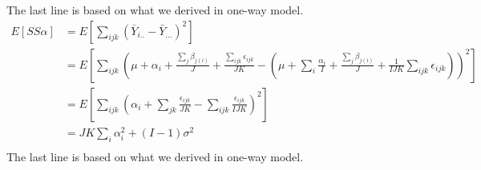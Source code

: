 \documentclass[a4paper]{article}
\begin{document}
The last line is based on what we derived in one-way model.
\begin{align*}
	E[SS\alpha] & = E[\sum_{ijk}(\bar Y_{i..} - \bar Y_{...})^2]\\
				& = E[\sum_{ijk}(\mu + \alpha_i + \frac{\sum_j \beta_{j(i)}}{J} + \frac{\sum_{ijk} \epsilon_{ijk}}{JK}
				-(\mu + \sum_{i} \frac{\alpha_i}{I} + \frac{\sum_j \beta_{j(i)}}{J}  + \frac{1}{IJK} \sum_{ijk} \epsilon_{ijk}))^2]\\
				& = E[\sum_{ijk}(\alpha_i + \sum_{jk} \frac{\epsilon_{ijk}}{JK} - \sum_{ijk} \frac{\epsilon_{ijk}}{IJK})^2]\\
				& = JK \sum_{i} \alpha^2_{i} + (I-1)\sigma^2 \\
\end{align*}
The last line is based on what we derived in one-way model.
\end{document}
